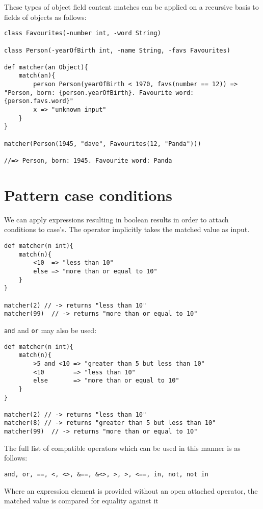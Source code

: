 \documentclass[conc-doc]{subfiles}
\begin{document}
These types of object field content matches can be applied on a recursive basis to fields of objects as follows:
\begin{lstlisting}
class Favourites(-number int, -word String)

class Person(-yearOfBirth int, -name String, -favs Favourites)

def matcher(an Object){
	match(an){
		person Person(yearOfBirth < 1970, favs(number == 12)) => "Person, born: {person.yearOfBirth}. Favourite word: {person.favs.word}"
		x => "unknown input"
	}
}

matcher(Person(1945, "dave", Favourites(12, "Panda")))

//=> Person, born: 1945. Favourite word: Panda
\end{lstlisting}

\section{Pattern case conditions}
We can apply expressions resulting in boolean results in order to attach conditions to case's. The operator implicitly takes the matched value as input.

\begin{lstlisting}
def matcher(n int){
	match(n){
		<10  => "less than 10" 
		else => "more than or equal to 10" 
	}
}

matcher(2) // -> returns "less than 10"
matcher(99)  // -> returns "more than or equal to 10"
\end{lstlisting}

\lstinline{and} and \lstinline{or} may also be used:

\begin{lstlisting}
def matcher(n int){
	match(n){
		>5 and <10 => "greater than 5 but less than 10" 
		<10        => "less than 10" 
		else       => "more than or equal to 10" 
	}
}

matcher(2) // -> returns "less than 10"
matcher(8) // -> returns "greater than 5 but less than 10"
matcher(99)  // -> returns "more than or equal to 10"
\end{lstlisting}

The full list of compatible operators which can be used in this manner is as follows:

\lstinline{and, or, ==, <, <>, &==, &<>, >, >, <==, in, not, not in}

Where an expression element is provided without an open attached operator, the matched value is compared for equality against it
\end{document}
